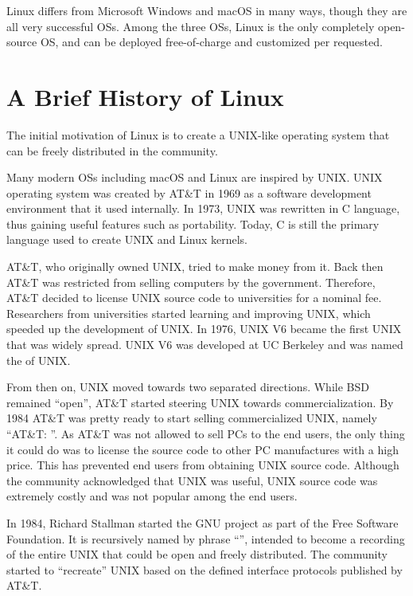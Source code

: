 Linux differs from Microsoft Windows and macOS in many ways, though they are all very successful OSs. Among the three OSs, Linux is the only completely open-source OS, and can be deployed free-of-charge and customized per requested.

\section{A Brief History of Linux}

The initial motivation of Linux is to create a UNIX-like operating system that can be freely distributed in the community.

Many modern OSs including macOS and Linux are inspired by UNIX. UNIX operating system was created by AT\&T in 1969 as a software development environment that it used internally. In 1973, UNIX was rewritten in C language, thus gaining useful features such as portability. Today, C is still the primary language used to create UNIX and Linux kernels.

AT\&T, who originally owned UNIX, tried to make money from it. Back then AT\&T was restricted from selling computers by the government. Therefore, AT\&T decided to license UNIX source code to universities for a nominal fee. Researchers from universities started learning and improving UNIX, which speeded up the development of UNIX. In 1976, UNIX V6 became the first UNIX that was widely spread. UNIX V6 was developed at UC Berkeley and was named the  of UNIX.

From then on, UNIX moved towards two separated directions. While BSD remained ``open'', AT\&T started steering UNIX towards commercialization. By 1984 AT\&T was pretty ready to start selling commercialized UNIX, namely ``AT\&T: ''. As AT\&T was not allowed to sell PCs to the end users, the only thing it could do was to license the source code to other PC manufactures with a high price. This has prevented end users from obtaining UNIX source code. Although the community acknowledged that UNIX was useful, UNIX source code was extremely costly and was not popular among the end users.

In 1984, Richard Stallman started the GNU project as part of the Free Software Foundation. It is recursively named by phrase ``'', intended to become a recording of the entire UNIX that could be open and freely distributed. The community started to ``recreate'' UNIX based on the defined interface protocols published by AT\&T.

